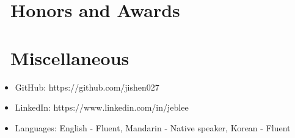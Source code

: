 \documentclass{resume}
\begin{document}
\section{\faHeartO\ Honors and Awards}

\section{\faInfo\ Miscellaneous}
\begin{itemize}[parsep=0.5ex]
  \item GitHub: https://github.com/jishen027
  \item LinkedIn: https://www.linkedin.com/in/jeblee
  \item Languages: English - Fluent, Mandarin - Native speaker, Korean - Fluent
\end{itemize}

%
%
\end{document}

